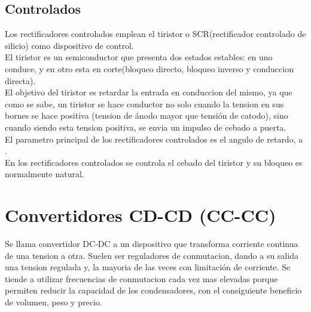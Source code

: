 \documentclass[11pt]{article}
\begin{document}
\subsection{Controlados}
Los rectificadores controlados emplean el tiristor o SCR(rectificador controlado de silicio) como dispositivo de control.\\
El tiristor es un semiconductor que presenta dos estados estables: en uno conduce, y en otro esta en corte(bloqueo directo, bloqueo inverso y conduccion directa).\\
El objetivo del tiristor es retardar la entrada en conduccion del mismo, ya que como se sabe, un tiristor se hace conductor no solo cuando la tension en sus bornes se hace positiva (tension de ánodo mayor que tensión de catodo), sino cuando siendo esta tension positiva, se envia un impulso de cebado a puerta.\\
El parametro principal de los rectificadores controlados es el angulo de retardo, a .\\
En los rectificadores controlados se controla el cebado del tiristor y su bloqueo es normalmente natural.

\section{Convertidores CD-CD (CC-CC)}
Se llama convertidor DC-DC a un dispositivo que transforma corriente continua de una tension a otra. Suelen ser reguladores de conmutacion, dando a su salida una tension regulada y, la mayoria de las veces con limitación de corriente. Se tiende a utilizar frecuencias de conmutacion cada vez mas elevadas porque permiten reducir la capacidad de los condensadores, con el consiguiente beneficio de volumen, peso y precio. 
\end{document}
